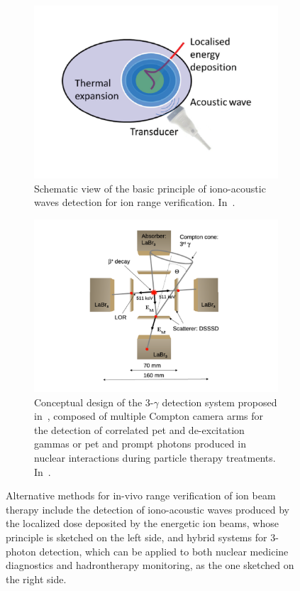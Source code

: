 \begin{figure}[!htbp]
\begin{subfigure}[t]{.49\textwidth}
\centering
\includegraphics[width=0.98\linewidth]{03_GraphicFiles/chapter1_Introduction/ionoacoustic.pdf}
\caption{Schematic view of the basic principle of iono-acoustic waves detection for ion range verification. In~\cite{Parodi2015b}.}
\label{chap1::fig::ionoacoustic}
\end{subfigure}
\begin{subfigure}[t]{.49\textwidth}
\centering
\includegraphics[width=0.92\linewidth]{03_GraphicFiles/chapter1_Introduction/3gamma.pdf}
\caption{Conceptual design of the 3-$\gamma$ detection system proposed in~\cite{Lang2014}, composed of multiple Compton camera arms for the detection of correlated \gls{pet} and de-excitation gammas or \gls{pet} and prompt photons produced in nuclear interactions during particle therapy treatments. In~\cite{Lang2014}.}
\label{chap1::fig::3gamma}
\end{subfigure}
\caption{Alternative methods for in-vivo range verification of ion beam therapy include the detection of iono-acoustic waves produced by the localized dose deposited by the energetic ion beams, whose principle is sketched on the left side, and hybrid systems for 3-photon detection, which can be applied to both nuclear medicine diagnostics and hadrontherapy monitoring, as the one sketched on the right side.}
\label{chap1::fig::alternativeRange}
\end{figure} 


